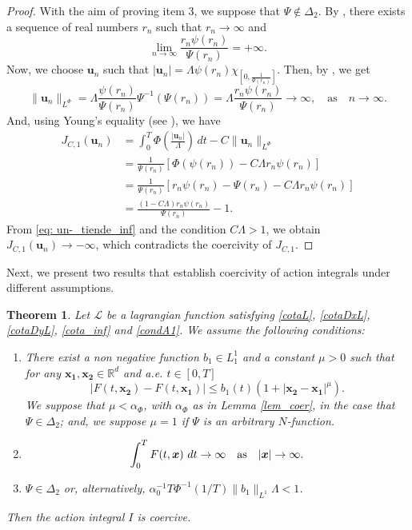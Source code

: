 \documentclass[twoside]{elsarticle}
\newtheorem{thm}{Theorem}[section]
\theoremstyle{remark}
\newcommand{\orlnor}{\|_{L^{\Phi}}}
\renewcommand{\b}[1]{\boldsymbol{#1}}
\newcommand{\rr}{\mathbb{R}}
\renewcommand{\leq}{\leqslant}
\begin{document}
\begin{proof}
With the aim of proving item 3, we suppose that $\Psi \notin \Delta_2$. 
By \cite[Thm. 4.1]{KR},  there exists a sequence of real  numbers  $r_n$ such that
$r_n \to \infty$ and 
\begin{equation}\label{eq: un-_tiende_inf}
\lim\limits_{n \to \infty} \frac{r_n \psi(r_n)}{\Psi(r_n)}=+\infty.
\end{equation}
Now, we choose $\b{u}_n$ such that
$|\b{u}_n|=\Lambda\psi(r_n)\chi_{[0,\frac{1}{\Psi(r_n)}]}$. Then, 
by \cite[Eq. (9.11)]{KR}, we get 
\[
\|\b{u}_n\orlnor =\Lambda\frac{\psi(r_n)}{\Psi(r_n)}\Psi^{-1}(\Psi(r_n))=
\Lambda\frac{r_n\psi(r_n)}{\Psi(r_n)}\to \infty,\quad\text{as}\quad n \to \infty.
\]
And, using Young's equality (see \cite[Eq. (2.7)]{KR}), we have
\[
\begin{split}
J_{C,1}(\b{u}_n)&=\int_0^T \Phi\left(\frac{|\b{u}_n|}{\Lambda}\right)\,dt-C\|\b{u}_n\orlnor\\
&=
\frac{1}{\Psi(r_n)}\left[\Phi(\psi(r_n))  -C\Lambda r_n\psi(r_n)\right]\\
&=
\frac{1}{\Psi(r_n)} \left[ r_n\psi(r_n)-\Psi(r_n)- C\Lambda r_n\psi(r_n) \right]\\
&=\frac{(1- C\Lambda) r_n\psi(r_n)}{\Psi(r_n)}-1.
\end{split}
\]
From \eqref{eq: un-_tiende_inf} and the condition $C\Lambda>1$, we obtain  $J_{C,1}(\b{u}_n)\to-\infty$, which contradicts the coercivity  of $J_{C,1}$.
\end{proof}




Next, we present two results that establish coercivity of action integrals under different assumptions. 



\begin{thm}\label{coercitividad1}
Let  $\mathcal{L}$ be a lagrangian function satisfying \eqref{cotaL}, \eqref{cotaDxL}, \eqref{cotaDyL}, \eqref{cota_inf} and \eqref{condA1}. We assume the following conditions:
\begin{enumerate}
\item There exist a non negative function  $b_1 \in L^1_1$ and a constant $\mu>0$  such that for any $\b{x_1},\b{x_2}\in\rr^d$ and a.e. $t\in [0,T]$
\begin{equation}\label{holder_cont}
  \left| F(t,\b{x_2})- F(t,\b{x_1}) \right|\leq b_1(t)(1+|\b{x_2}-\b{x_1}|^{\mu}).
\end{equation}
We suppose that $\mu< \alpha_{\Phi}$,  with $\alpha_{\Phi}$ as in Lemma \ref{lem_coer}, in the case that $\Psi\in\Delta_2$; and, we suppose $\mu=1$  if $\Psi$ is an  arbitrary $N$-function. 
\item
\begin{equation}\label{propiedad1coercividad}
\int_{0}^{T}F(t,\b{x})\ dt \rightarrow \infty \quad \hbox{as} \quad |\b{x}|\rightarrow \infty.
\end{equation}
\item\label{hipot_coer}  $\Psi\in\Delta_2$ or, alternatively, 
$\alpha_0^{-1}T\Phi^{-1}\left(1/T\right)\|b_1\|_{L^1}\Lambda<1$.
\end{enumerate}
Then  the action integral $I$ is coercive.
\end{thm}
\end{document}
